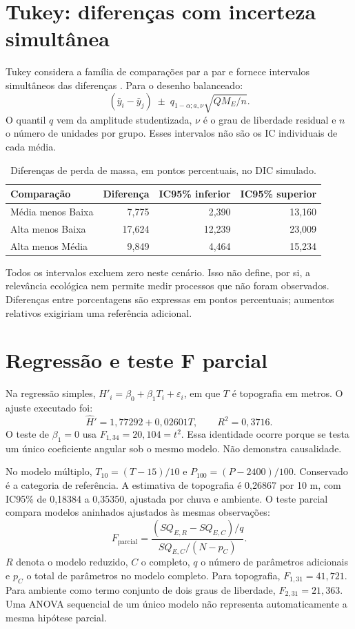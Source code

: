 \section{Tukey: diferenças com incerteza simultânea}
Tukey considera a família de comparações par a par e fornece intervalos simultâneos das diferenças \parencite{rtukey}. Para o desenho balanceado:
\begin{equation}
(\bar y_i-\bar y_j)\;\pm\;
q_{1-\alpha;a,\nu}\sqrt{QM_E/n}.
\end{equation}
O quantil $q$ vem da amplitude studentizada, $\nu$ é o grau de liberdade residual e $n$ o número de unidades por grupo. Esses intervalos não são os IC individuais de cada média.
\begin{table}[H]\centering\small
\caption{Diferenças de perda de massa, em pontos percentuais, no DIC simulado.}
\begin{tabular}{lrrr}\toprule Comparação & Diferença & IC95\% inferior & IC95\% superior\\\midrule
Média menos Baixa & 7,775 & 2,390 & 13,160\\
Alta menos Baixa & 17,624 & 12,239 & 23,009\\
Alta menos Média & 9,849 & 4,464 & 15,234\\\bottomrule
\end{tabular}\end{table}
Todos os intervalos excluem zero neste cenário. Isso não define, por si, a relevância ecológica nem permite medir processos que não foram observados. Diferenças entre porcentagens são expressas em pontos percentuais; aumentos relativos exigiriam uma referência adicional.

\section{Regressão e teste F parcial}
Na regressão simples, $H'_i=\beta_0+\beta_1T_i+\varepsilon_i$, em que $T$ é topografia em metros. O ajuste executado foi:
\begin{equation}\widehat H'=1{,}77292+0{,}02601T,\qquad R^2=0{,}3716.\end{equation}
O teste de $\beta_1=0$ usa $F_{1,34}=20{,}104=t^2$. Essa identidade ocorre porque se testa um único coeficiente angular sob o mesmo modelo. Não demonstra causalidade.

No modelo múltiplo, $T_{10}=(T-15)/10$ e $P_{100}=(P-2400)/100$. Conservado é a categoria de referência. A estimativa de topografia é 0,26867 por 10 m, com IC95\% de 0,18384 a 0,35350, ajustada por chuva e ambiente. O teste parcial compara modelos aninhados ajustados às mesmas observações:
\begin{equation}
F_{\mathrm{parcial}}=
\frac{(SQ_{E,R}-SQ_{E,C})/q}{SQ_{E,C}/(N-p_C)}.
\end{equation}
$R$ denota o modelo reduzido, $C$ o completo, $q$ o número de parâmetros adicionais e $p_C$ o total de parâmetros no modelo completo. Para topografia, $F_{1,31}=41{,}721$. Para ambiente como termo conjunto de dois graus de liberdade, $F_{2,31}=21{,}363$. Uma ANOVA sequencial de um único modelo não representa automaticamente a mesma hipótese parcial.

